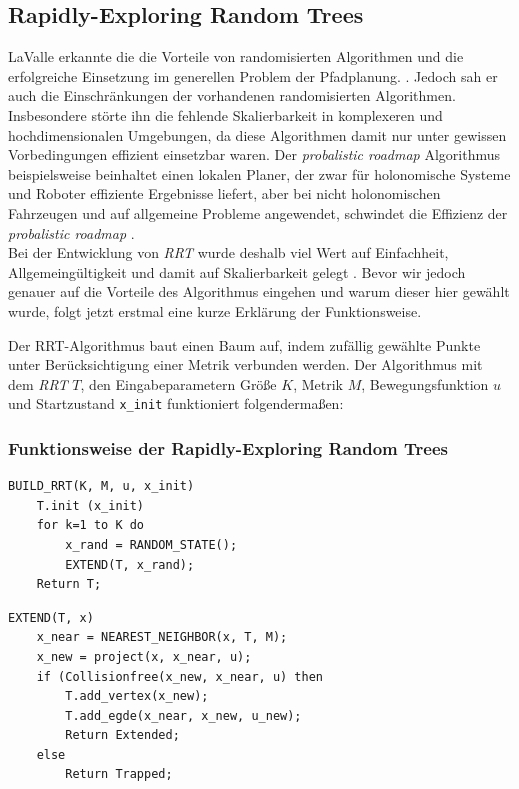 \subsection{Rapidly-Exploring Random Trees}
\label{RRT}
LaValle erkannte die die Vorteile von randomisierten Algorithmen und die \glqq erfolgreiche Einsetzung im generellen Problem der Pfadplanung\grqq{}. \citep[Kap 1][]{Lav98}. Jedoch sah er auch die Einschränkungen der vorhandenen randomisierten Algorithmen. Insbesondere störte ihn die fehlende Skalierbarkeit in komplexeren und hochdimensionalen Umgebungen, da diese Algorithmen damit nur unter gewissen Vorbedingungen effizient einsetzbar waren. Der \textit{probalistic roadmap} Algorithmus \citep{AmWu96} beispielsweise beinhaltet einen \glqq lokalen Planer\grqq, der zwar für holonomische Systeme und Roboter effiziente Ergebnisse liefert, aber bei nicht holonomischen Fahrzeugen und auf allgemeine Probleme angewendet, schwindet die Effizienz der \textit{probalistic roadmap} \citep{Lav98} .\\
Bei der Entwicklung von \textit{RRT} wurde deshalb viel Wert auf Einfachheit, Allgemeingültigkeit und damit auf Skalierbarkeit gelegt \citep[vlg. Kap 3,][]{Lav98}. Bevor wir jedoch genauer auf die Vorteile des Algorithmus eingehen und warum dieser hier gewählt wurde, folgt jetzt erstmal eine kurze Erklärung der Funktionsweise. 

Der RRT-Algorithmus baut einen Baum auf, indem zufällig gewählte Punkte unter Berücksichtigung einer Metrik verbunden werden. Der Algorithmus mit dem \textit{RRT} $T$, den Eingabeparametern Größe $K$, Metrik $M$, Bewegungsfunktion $u$ und Startzustand \verb|x_init|  funktioniert folgendermaßen:

\subsubsection{Funktionsweise der Rapidly-Exploring Random Trees}
\begin{lstlisting}
BUILD_RRT(K, M, u, x_init)
	T.init (x_init)
	for k=1 to K do
		x_rand = RANDOM_STATE();
		EXTEND(T, x_rand);
	Return T;
\end{lstlisting}
\begin{lstlisting}
EXTEND(T, x)
	x_near = NEAREST_NEIGHBOR(x, T, M);
	x_new = project(x, x_near, u);
	if (Collisionfree(x_new, x_near, u) then
		T.add_vertex(x_new);
		T.add_egde(x_near, x_new, u_new);
		Return Extended;
	else
		Return Trapped;
\end{lstlisting}

